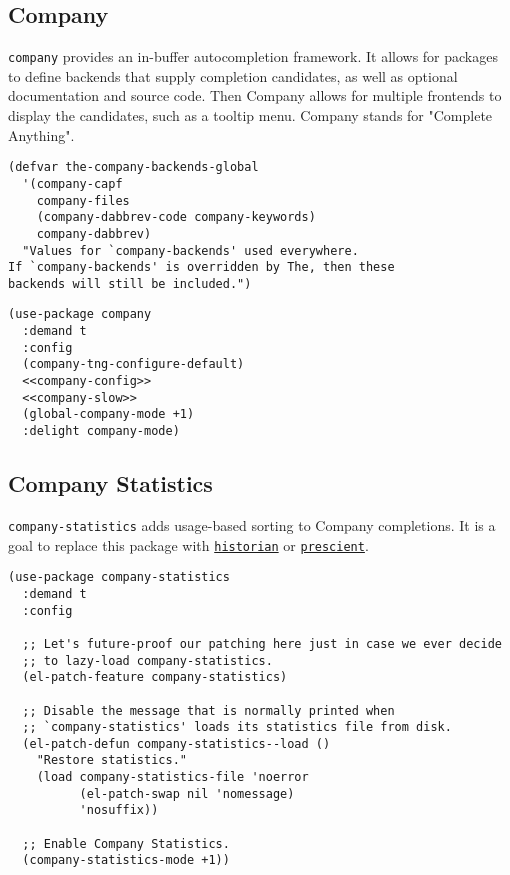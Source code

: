 \documentclass[11pt]{article}
\begin{document}
\subsection{Company}
\label{sec:orgcb56371}
\texttt{company} provides an in-buffer autocompletion framework. It
allows for packages to define backends that supply completion
candidates, as well as optional documentation and source code. Then
Company allows for multiple frontends to display the candidates, such
as a tooltip menu. Company stands for "Complete Anything".

\begin{verbatim}
(defvar the-company-backends-global
  '(company-capf
    company-files
    (company-dabbrev-code company-keywords)
    company-dabbrev)
  "Values for `company-backends' used everywhere.
If `company-backends' is overridden by The, then these
backends will still be included.")
\end{verbatim}

\begin{verbatim}
(use-package company
  :demand t
  :config
  (company-tng-configure-default)
  <<company-config>>
  <<company-slow>>
  (global-company-mode +1)
  :delight company-mode)
\end{verbatim}

\subsection{Company Statistics}
\label{sec:org6e02863}
\texttt{company-statistics} adds usage-based sorting to Company completions.
It is a goal to replace this package with \href{https://github.com/PythonNut/historian.el}{\texttt{historian}} or \href{https://github.com/raxod502/prescient.el}{\texttt{prescient}}.

\begin{verbatim}
(use-package company-statistics
  :demand t
  :config

  ;; Let's future-proof our patching here just in case we ever decide
  ;; to lazy-load company-statistics.
  (el-patch-feature company-statistics)

  ;; Disable the message that is normally printed when
  ;; `company-statistics' loads its statistics file from disk.
  (el-patch-defun company-statistics--load ()
    "Restore statistics."
    (load company-statistics-file 'noerror
          (el-patch-swap nil 'nomessage)
          'nosuffix))

  ;; Enable Company Statistics.
  (company-statistics-mode +1))
\end{verbatim}
\end{document}
